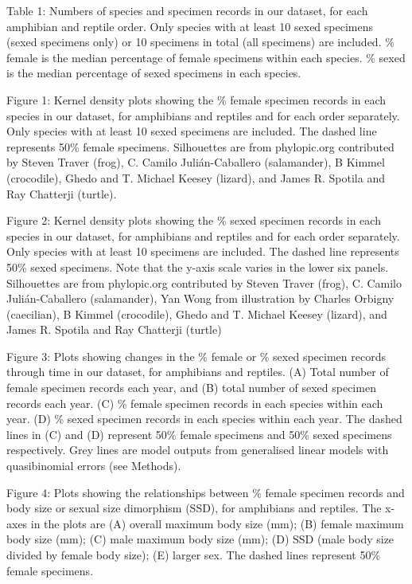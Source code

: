 \documentclass[a4paper, 12pt]{article}
\begin{document}
Table 1: Numbers of species and specimen records in our dataset, for each amphibian and reptile order. Only species with at least 10 sexed specimens (sexed specimens only) or 10 specimens in total (all specimens) are included. \% female is the median percentage of female specimens within each species. \% sexed is the median percentage of sexed specimens in each species.

Figure 1: Kernel density plots showing the \% female specimen records in each species in our dataset, for amphibians and reptiles and for each order separately. Only species with at least 10 sexed specimens are included. The dashed line represents 50\% female specimens. Silhouettes are from phylopic.org contributed by Steven Traver (frog), C. Camilo Julián-Caballero (salamander), B Kimmel (crocodile), Ghedo and T. Michael Keesey (lizard), and James R. Spotila and Ray Chatterji (turtle).

Figure 2: Kernel density plots showing the \% sexed specimen records in each species in our dataset, for amphibians and reptiles and for each order separately. Only species with at least 10 specimens are included. The dashed line represents 50\% sexed specimens. Note that the y-axis scale varies in the lower six panels. Silhouettes are from phylopic.org contributed by Steven Traver (frog), C. Camilo Julián-Caballero (salamander), Yan Wong from illustration by Charles Orbigny (caecilian), B Kimmel (crocodile), Ghedo and T. Michael Keesey (lizard), and James R. Spotila and Ray Chatterji (turtle)

Figure 3: Plots showing changes in the \% female or \% sexed specimen records through time in our dataset, for amphibians and reptiles. (A) Total number of female specimen records each year, and (B) total number of sexed specimen records each year. (C) \% female specimen records in each species within each year. (D) \% sexed specimen records in each species within each year. The dashed lines in (C) and (D) represent 50\% female specimens and 50\% sexed specimens respectively. Grey lines are model outputs from generalised linear models with quasibinomial errors (see Methods).

Figure 4: Plots showing the relationships between \% female specimen records and body size or sexual size dimorphism (SSD), for amphibians and reptiles. The x-axes in the plots are (A) overall maximum body size (mm); (B) female maximum body size (mm); (C) male maximum body size (mm); (D) SSD (male body size divided by female body size); (E) larger sex. The dashed lines represent 50\% female specimens.
\end{document}
